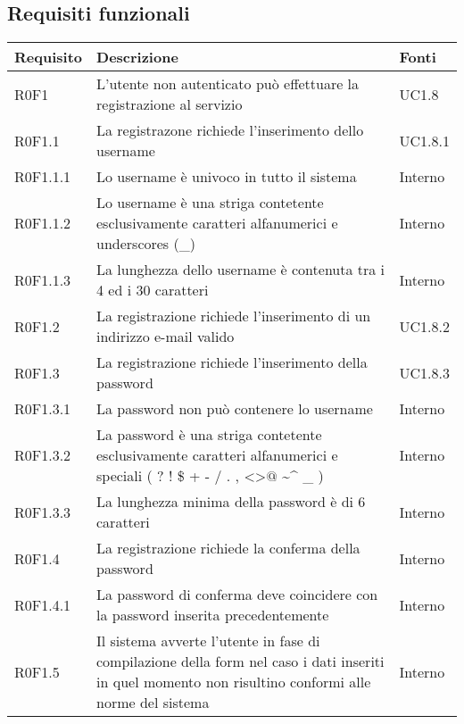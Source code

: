 \subsection{Requisiti funzionali}

\begin{center}

	\def\arraystretch{1.5}
	\bgroup
	\begin{longtable}{| p{2cm} | p{8cm} | p{2cm} |}

		\hline
		\textbf{Requisito} & \textbf{Descrizione} & \textbf{Fonti} \\
		\hline

		R0F1  &  L'utente non autenticato può effettuare la registrazione al servizio  &  UC1.8 \\
		\hline
		R0F1.1  &  La registrazone richiede l'inserimento dello username  &  UC1.8.1 \\
		\hline
		R0F1.1.1  &  Lo username è univoco in tutto il sistema  &  Interno \\
		\hline
		R0F1.1.2  &  Lo username è una striga contetente esclusivamente caratteri alfanumerici e underscores (\_)  &  Interno \\
		\hline
		R0F1.1.3  &  La lunghezza dello username è contenuta tra i 4 ed i 30 caratteri  &  Interno \\
		\hline
		R0F1.2  &  La registrazione richiede l'inserimento di un indirizzo e-mail valido &  UC1.8.2 \\
		\hline
		R0F1.3  &  La registrazione richiede l'inserimento della password  &  UC1.8.3 \\
		\hline
		R0F1.3.1  &  La password non può contenere lo username  &  Interno \\
		\hline
		R0F1.3.2  &  La password è una striga contetente esclusivamente caratteri alfanumerici e speciali ( ? ! \$ + - / . , \textless \textgreater $@$ \textasciitilde \^{} \_ )  &  Interno \\
		\hline
		R0F1.3.3  &  La lunghezza minima della password è di 6 caratteri  &  Interno \\
		\hline
		R0F1.4  &  La registrazione richiede la conferma della password  &  Interno \\
		\hline
		R0F1.4.1  &  La password di conferma deve coincidere con la password inserita precedentemente  &  Interno \\
		\hline
		R0F1.5  &  Il sistema avverte l'utente in fase di compilazione della form nel caso i dati inseriti in quel momento non risultino conformi alle norme del sistema  &  Interno \\

\end{longtable}
\end{center}
